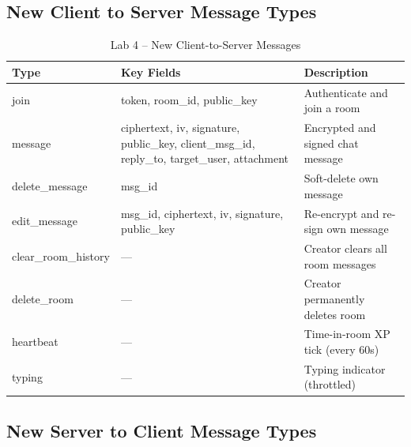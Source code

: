 \documentclass[12pt, a4paper]{article}
\begin{document}
\subsection{New Client to Server Message Types}

\begin{table}[H]
    \centering
    \small %
    \caption{Lab 4 -- New Client-to-Server Messages}
    \begin{tabularx}{\textwidth}{l X X}
        \toprule
        \textbf{Type} & \textbf{Key Fields} & \textbf{Description} \\
        \midrule
        join             & token, room\_id, public\_key & Authenticate and join a room \\
        message          & ciphertext, iv, signature, public\_key, client\_msg\_id, reply\_to, target\_user, attachment & Encrypted and signed chat message \\
        delete\_message  & msg\_id & Soft-delete own message \\
        edit\_message    & msg\_id, ciphertext, iv, signature, public\_key & Re-encrypt and re-sign own message \\
        clear\_room\_history & --- & Creator clears all room messages \\
        delete\_room     & --- & Creator permanently deletes room \\
        heartbeat        & --- & Time-in-room XP tick (every 60s) \\
        typing           & --- & Typing indicator (throttled) \\
        \bottomrule
    \end{tabularx}
\end{table}

\subsection{New Server to Client Message Types}
\end{document}
